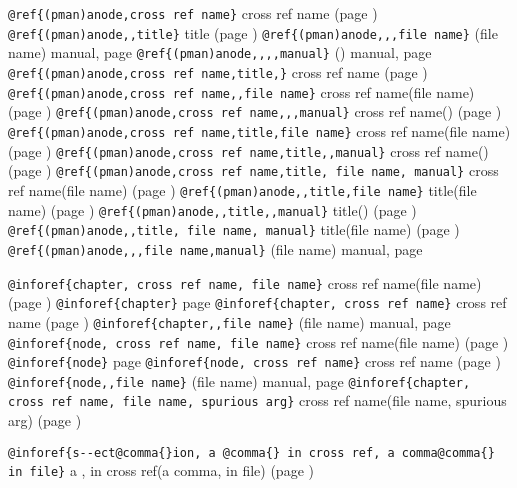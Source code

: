 \documentclass{book}
\begin{document}
\begin{titlepage}
\texttt{@ref\{(pman)anode,cross ref name\}} cross ref name (page \pageref{anchor:_0028pman_0029anode})
\texttt{@ref\{(pman)anode,,title\}} title (page \pageref{anchor:_0028pman_0029anode})
\texttt{@ref\{(pman)anode,,,file name\}} (file name) manual, page \pageref{anchor:_0028pman_0029anode}
\texttt{@ref\{(pman)anode,,,,manual\}} () manual, page \pageref{anchor:_0028pman_0029anode}
\texttt{@ref\{(pman)anode,cross ref name,title,\}} cross ref name (page \pageref{anchor:_0028pman_0029anode})
\texttt{@ref\{(pman)anode,cross ref name,,file name\}} cross ref name(file name) (page \pageref{anchor:_0028pman_0029anode})
\texttt{@ref\{(pman)anode,cross ref name,,,manual\}} cross ref name() (page \pageref{anchor:_0028pman_0029anode})
\texttt{@ref\{(pman)anode,cross ref name,title,file name\}} cross ref name(file name) (page \pageref{anchor:_0028pman_0029anode})
\texttt{@ref\{(pman)anode,cross ref name,title,,manual\}} cross ref name() (page \pageref{anchor:_0028pman_0029anode})
\texttt{@ref\{(pman)anode,cross ref name,title, file name, manual\}} cross ref name(file name) (page \pageref{anchor:_0028pman_0029anode})
\texttt{@ref\{(pman)anode,,title,file name\}} title(file name) (page \pageref{anchor:_0028pman_0029anode})
\texttt{@ref\{(pman)anode,,title,,manual\}} title() (page \pageref{anchor:_0028pman_0029anode})
\texttt{@ref\{(pman)anode,,title, file name, manual\}} title(file name) (page \pageref{anchor:_0028pman_0029anode})
\texttt{@ref\{(pman)anode,,,file name,manual\}} (file name) manual, page \pageref{anchor:_0028pman_0029anode}


\texttt{@inforef\{chapter, cross ref name, file name\}} cross ref name(file name) (page \pageref{anchor:chapter})
\texttt{@inforef\{chapter\}} page \pageref{anchor:chapter}
\texttt{@inforef\{chapter, cross ref name\}} cross ref name (page \pageref{anchor:chapter})
\texttt{@inforef\{chapter,,file name\}} (file name) manual, page \pageref{anchor:chapter}
\texttt{@inforef\{node, cross ref name, file name\}} cross ref name(file name) (page \pageref{anchor:node})
\texttt{@inforef\{node\}} page \pageref{anchor:node}
\texttt{@inforef\{node, cross ref name\}} cross ref name (page \pageref{anchor:node})
\texttt{@inforef\{node,,file name\}} (file name) manual, page \pageref{anchor:node}
\texttt{@inforef\{chapter, cross ref name, file name, spurious arg\}} cross ref name(file name, spurious arg) (page \pageref{anchor:chapter})

\texttt{@inforef\{s{-}{-}ect@comma\{\}ion, a @comma\{\} in cross
ref, a comma@comma\{\} in file\}}
a , in cross
ref(a comma, in file) (page \pageref{anchor:s_002d_002dect_002cion})



\end{titlepage}
\end{document}
